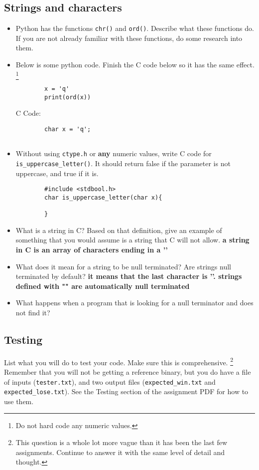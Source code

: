 \documentclass{article}
\begin{document}
\subsection{Strings and characters}
\begin{itemize}
    \item Python has the functions \texttt{chr()} and \texttt{ord()}. Describe what these functions do. If you are not already familiar with these functions, do some research into them. 
    \item Below is some python code. Finish the C code below so it has the same effect. \footnote{Do not hard code any numeric values.}
    \begin{lstlisting}
        x = 'q'
        print(ord(x))
    \end{lstlisting}
    C Code:
    \begin{lstlisting}
        char x = 'q';
        
    \end{lstlisting}
    \item Without using \texttt{ctype.h} or \textbf{any} numeric values, write C code for \texttt{is_uppercase_letter()}. It should return false if the parameter is not uppercase, and true if it is. 
    \begin{lstlisting}
        #include <stdbool.h>
        char is_uppercase_letter(char x){
            
        }
    \end{lstlisting}
    
    \item What is a string in C? Based on that definition, give an example of something that you would assume is a string that C will not allow. \textbf{a string in C is an array of characters ending in a '\0'}
    \item What does it mean for a string to be null terminated? Are strings null terminated by default? \textbf{it means that the last character is '\0'. strings defined with "" are automatically null terminated}
    \item What happens when a program that is looking for a null terminator and does not find it?
    
\end{itemize}

\subsection{Testing}
List what you will do to test your code. Make sure this is comprehensive. \footnote{This question is a whole lot more vague than it has been the last few assignments. Continue to answer it with the same level of detail and thought.} Remember that you will not be getting a reference binary,
but you do have a file of inputs (\texttt{tester.txt}), and two output files (\texttt{expected_win.txt} and \texttt{expected_lose.txt}).
See the Testing section of the assignment PDF for how to use them.
\end{document}
